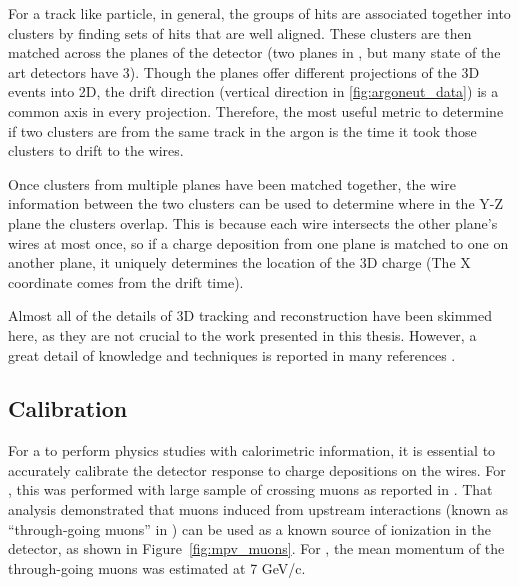 For a track like particle, in general, the groups of hits are associated together into clusters by finding sets of hits that are well aligned.  These clusters are then matched across the planes of the detector (two planes in \argoneut, but many state of the art detectors have 3).  Though the planes offer different projections of the 3D events into 2D, the drift direction (vertical direction in \ref{fig:argoneut_data}) is a common axis in every projection.  Therefore, the most useful metric to determine if two clusters are from the same track in the argon is the time it took those clusters to drift to the wires.

Once clusters from multiple planes have been matched together, the wire information between the two clusters can be used to determine where in the Y-Z plane the clusters overlap.  This is because each wire intersects the other plane's wires at most once, so if a charge deposition from one plane is matched to one on another plane, it uniquely determines the location of the 3D charge (The X coordinate comes from the drift time).

Almost all of the details of 3D tracking and reconstruction have been skimmed here, as they are not crucial to the work presented in this thesis.  However, a great detail of knowledge and techniques is reported in many references \cite{Antonello:2012hu,uboone_pub_1015}.

%
%

\subsection{\label{subsec:lartpc_calibration} Calibration}

For a \lartpc to perform physics studies with calorimetric information, it is essential to accurately calibrate the detector response to charge depositions on the wires.  For \argoneut, this was performed with large sample of crossing muons as reported in \cite{Anderson:2012mra}.  That analysis demonstrated that muons induced from upstream interactions (known as ``through-going muons'' in \argoneut) can be used as a known source of ionization in the detector, as shown in Figure~\ref{fig:mpv_muons}.  For \argoneut, the mean momentum of the through-going muons was estimated at 7 GeV/c.

